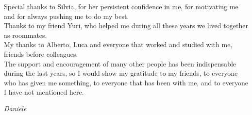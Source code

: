 Special thanks to Silvia, for her persistent confidence in me, for motivating me and for always pushing me to do my best.\\

Thanks to my friend Yuri, who helped me during all these years we lived together as roommates.\\

My thanks to Alberto, Luca and everyone that worked and studied with me, friends before colleagues.\\

The support and encouragement of many other people has been indispensable during the last years, so I would show my gratitude to my friends, to everyone who has given me something, to everyone that has been with me, and to everyone I have not mentioned here.\\

\begin{flushright}
\textit{Daniele}
\end{flushright}

 


